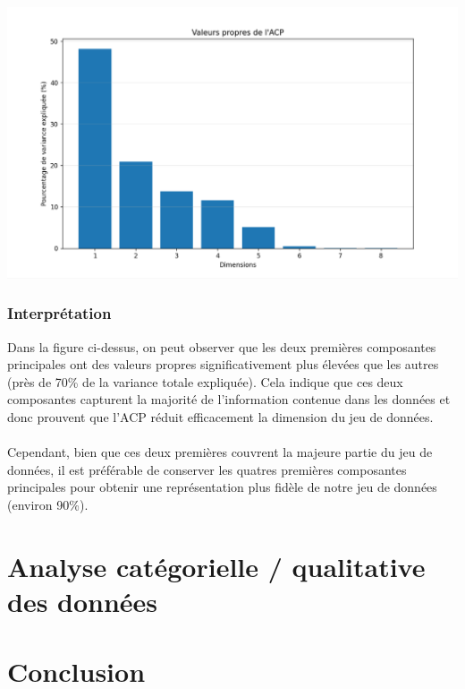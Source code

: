 \documentclass[12pt]{scrartcl}
\begin{document}
                \begin{center}
                    \includegraphics[width=1\textwidth]{images/valeurs_propres_ACP.png}
                \end{center}

            \subsubsection{Interprétation}
                Dans la figure ci-dessus, on peut observer que les deux premières composantes principales ont des valeurs propres significativement plus élevées que les autres (près de 70\% de la variance totale expliquée). Cela indique que ces deux composantes capturent la majorité de l'information contenue dans les données et donc prouvent que l'ACP réduit efficacement la dimension du jeu de données.\\\\
                Cependant, bien que ces deux premières couvrent la majeure partie du jeu de données, il est préférable de conserver les quatres premières composantes principales pour obtenir une représentation plus fidèle de notre jeu de données (environ 90\%).\\                
                

        
    \section{Analyse catégorielle / qualitative des données}




    \section{Conclusion}
\end{document}
